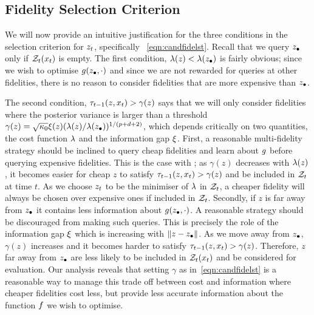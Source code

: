 \insertAlgoMFGPUCBTwo

\subsection{Fidelity Selection Criterion}
\label{sec:fidelSelection}

We will now provide an intuitive justification for the three conditions in the
 selection criterion for $z_t$, specifically ~\eqref{eqn:candfidelst}.
Recall that we query $z_{\bullet}$ only if $\mathcal{Z}_t(x_t)$ is empty.
The first condition, $\lambda(z) < \lambda(z_{\bullet})$ is fairly obvious;
since we wish to optimise $g(z_{\bullet}, \cdot)$ and since we are not rewarded for queries at
other fidelities, there
is no reason to consider fidelities that are more expensive than $z_{\bullet}$. 

The second condition, $\tau_{t-1}(z,x_t) > \gamma(z)$ says that we will only consider
fidelities where the posterior
variance is larger than a threshold
$\gamma(z) = \sqrt{\kappa_0}\xi(z)(\lambda(z)/\lambda(z_{\bullet}))^{1/(p+d+2)}$,
 which depends critically on two
quantities, the cost function $\lambda$ and the information gap $\xi$.
First, a reasonable multi-fidelity strategy should be inclined to query cheap
fidelities and learn about $g$ before querying expensive fidelities.
This is the case with \mfgpucbtwo; as $\gamma(z)$ decreases with $\lambda(z)$, it becomes
easier for cheap $z$ to satisfy $\tau_{t-1}(z,x_t)>\gamma(z)$ and be included in
$\mathcal{Z}_t$ at time $t$.
As we choose $z_t$ to be the minimiser of $\lambda$ in $\mathcal{Z}_t$,
a cheaper fidelity will always be chosen over expensive ones if included in $\mathcal{Z}_t$.
Secondly, if $z$ is far away from $z_{\bullet}$ it contains less information
about $g(z_{\bullet},\cdot)$.
A reasonable strategy should be discouraged from making such queries.
This is precisely the role of the information gap $\xi$ which is increasing with
$\|z-z_{\bullet}\|$.
As we move away from $z_{\bullet}$, $\gamma(z)$ increases and
it becomes harder to satisfy $\tau_{t-1}(z,x_t)>\gamma(z)$.
Therefore, $z$ far away from $z_{\bullet}$ are  less likely
to be included in $\mathcal{Z}_t(x_t)$ and be considered for evaluation.
Our analysis reveals that setting $\gamma$ as in~\eqref{eqn:candfidelst} is a
reasonable way to manage this trade off between cost and information where
cheaper fidelities cost less, but provide less accurate information about the
function $f$ we wish to optimise.


